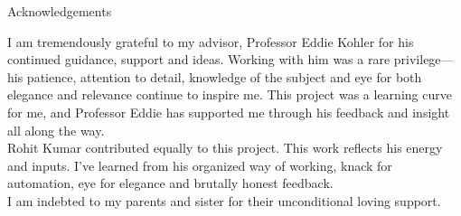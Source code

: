 \begin{center}
{\large Acknowledgements}
\end{center}

I am tremendously grateful to my advisor, Professor Eddie Kohler for
his continued guidance, support and ideas. Working with him was a rare privilege---  his patience, attention to detail, knowledge of the subject and eye for both elegance and relevance continue to inspire me. This project was a learning curve for me, and Professor Eddie has supported me
through his feedback and insight all along the way.\\

Rohit Kumar contributed equally to this project. This work reflects his energy and inputs. I've learned from his organized way of working, knack for automation, eye for elegance and brutally honest feedback.\\

I am indebted to my parents and sister for their unconditional loving support.

